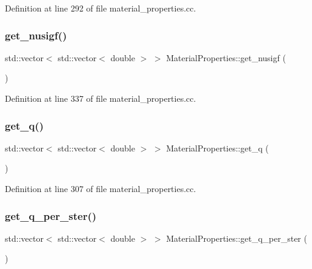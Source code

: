 Definition at line 292 of file material\+\_\+properties.\+cc.

\mbox{\label{class_material_properties_a75afcc7707f4d77aedf439bacacbfb51}} 
\subsubsection{\texorpdfstring{get\+\_\+nusigf()}{get\_nusigf()}}
{\footnotesize\ttfamily std\+::vector$<$ std\+::vector$<$ double $>$ $>$ Material\+Properties\+::get\+\_\+nusigf (\begin{DoxyParamCaption}{ }\end{DoxyParamCaption})}



Definition at line 337 of file material\+\_\+properties.\+cc.

\mbox{\label{class_material_properties_a0bbf8a7d69c73288b015b4247ab0451c}} 
\subsubsection{\texorpdfstring{get\+\_\+q()}{get\_q()}}
{\footnotesize\ttfamily std\+::vector$<$ std\+::vector$<$ double $>$ $>$ Material\+Properties\+::get\+\_\+q (\begin{DoxyParamCaption}{ }\end{DoxyParamCaption})}



Definition at line 307 of file material\+\_\+properties.\+cc.

\mbox{\label{class_material_properties_a3903e07c80bfe939a3a70be59c74bc53}} 
\subsubsection{\texorpdfstring{get\+\_\+q\+\_\+per\+\_\+ster()}{get\_q\_per\_ster()}}
{\footnotesize\ttfamily std\+::vector$<$ std\+::vector$<$ double $>$ $>$ Material\+Properties\+::get\+\_\+q\+\_\+per\+\_\+ster (\begin{DoxyParamCaption}{ }\end{DoxyParamCaption})}




